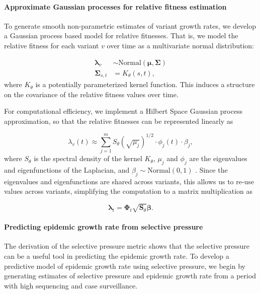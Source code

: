 \documentclass[12pt,oneside,letterpaper]{article}
\renewcommand{\vec}[1]{\boldsymbol{#1}}
\begin{document}
\paragraph{Approximate Gaussian processes for relative fitness estimation}%

To generate smooth non-parametric estimates of variant growth rates, we develop a Gaussian process based model for relative fitnesses.
That is, we model the relative fitness for each variant $v$ over time as a multivariate normal distribution:

\begin{align*}
    \vec{\lambda}_{v} &\sim \text{Normal}(\vec{\mu}, \vec{\Sigma})\\
    \vec{\Sigma}_{s, t} &= K_{\theta}(s, t),
\end{align*}
where $K_{\theta}$ is a potentially parameterized kernel function.
This induces a structure on the covariance of the relative fitness values over time.

For computational efficiency, we implement a Hilbert Space Gaussian process approximation, so that the relative fitnesses can be represented linearly as

\begin{equation}
    \lambda_{v}(t) \approx \sum_{j=1}^{m} S_{\theta}(\sqrt{\mu_{j}})^{1/2} \cdot \phi_{j}(t) \cdot \beta_{j},
\end{equation}
where $S_{\theta}$ is the spectral density of the kernel $K_\theta$, $\mu_{j}$ and $\phi_{j}$ are the eigenvalues and eigenfunctions of the Laplacian, and $\beta_{j} \sim \text{Normal}(0,1)$ \cite{riutortmayol2022practical}.
Since the eigenvalues and eigenfunctions are shared across variants, this allows us to re-use values across variants, simplifying the computation to a matrix multiplication as

\begin{equation*}
    \vec{\lambda}_{t} = \vec{\Phi}_{t} \sqrt{\vec{S}_{\theta}}\vec{\beta}.
\end{equation*}

\paragraph{Predicting epidemic growth rate from selective pressure}%

The derivation of the selective pressure metric shows that the selective pressure can be a useful tool in predicting the epidemic growth rate.
To develop a predictive model of epidemic growth rate using selective pressure, we begin by generating estimates of selective pressure and epidemic growth rate from a period with high sequencing and case surveillance.
\end{document}
